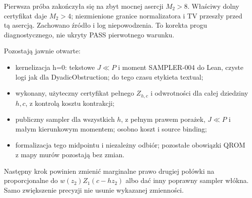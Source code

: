 \documentclass[11pt,a4paper]{article}
\begin{document}
Pierwsza próba zakończyła się na zbyt mocnej asercji $M_2>8$.
Właściwy dolny certyfikat daje $M_2>4$; niezmienione granice normalizatora
i TV przeszły przed tą asercją. Zachowano źródło i log niepowodzenia.
To korekta progu diagnostycznego, nie ukryty PASS pierwotnego warunku.

Pozostają jawnie otwarte:
\begin{itemize}
\item kernelizacja h=0: tekstowe $J\ll P$ i moment SAMPLER-004 do Lean,
czyste logi jak dla DyadicObstruction; do tego czasu etykieta textual;
\item wykonany, użyteczny certyfikat pełnego $Z_{h,c}$ i odwrotności dla
całej dziedziny $h,c$, z kontrolą kosztu kontrakcji;
\item publiczny sampler dla wszystkich $h$, z pełnym prawem porażek,
$J\ll P$ i małym kierunkowym momentem; osobno koszt i source binding;
\item formalizacja tego midpointu i niezależny odbiór; pozostałe obowiązki
QROM z mapy murów pozostają bez zmian.
\end{itemize}
Następny krok powinien zmienić marginalne prawo drugiej połówki na
proporcjonalne do $w(z_2)Z_1(c-hz_2)$ albo dać inny poprawny sampler
włókna. Samo zwiększenie precyzji nie usunie wykazanej zmienności.
\end{document}
